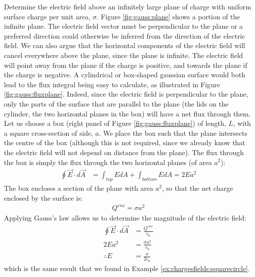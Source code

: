 \begin{example}{Determine the electric field above an infinitely large plane of charge with uniform surface charge per unit area, $\sigma$.} \label{ex:gaus:infiniteplate}
Figure \ref{fig:gauss:plane} shows a portion of the infinite plane. The electric field vector must be perpendicular to the plane or a preferred direction could otherwise be inferred from the direction of the electric field. We can also argue that the horizontal components of the electric field will cancel everywhere above the plane, since the plane is infinite. The electric field will point away from the plane if the charge is positive, and towards the plane if the charge is negative. 
A cylindrical or box-shaped gaussian surface would both lead to the flux integral being easy to calculate, as illustrated in Figure \ref{fig:gauss:fluxplane}. Indeed, since the electric field is perpendicular to the plane, only the parts of the surface that are parallel to the plane (the lids on the cylinder, the two horizontal planes in the box) will have a net flux through them.
Let us choose a box (right panel of Figure \ref{fig:gauss:fluxplane}) of length, $L$, with a square cross-section of side, $a$. We place the box such that the plane intersects the centre of the box (although this is not required, since we already know that the electric field will not depend on distance from the plane). The flux through the box is simply the flux through the two horizontal planes (of area $a^2$):
\begin{align*}
\oint \vec E\cdot d\vec A&= \int_{top} EdA+\int_{bottom}EdA=2Ea^2
\end{align*}
The box encloses a section of the plane with area $a^2$, so that the net charge enclosed by the surface is:
\begin{align*}
Q^{enc}=\sigma a^2
\end{align*}
Applying Gauss's law allows us to determine the magnitude of the electric field:
\begin{align*}
\oint \vec E\cdot d\vec A&=\frac{Q^{enc}}{\epsilon_0} \\
2Ea^2&= \frac{\sigma a^2}{\epsilon_0}\\
\therefore E&= \frac{\sigma}{2\epsilon_0}
\end{align*}
which is the same result that we found in Example \ref{ex:chargesfields:squarecircle}.


\end{example}
